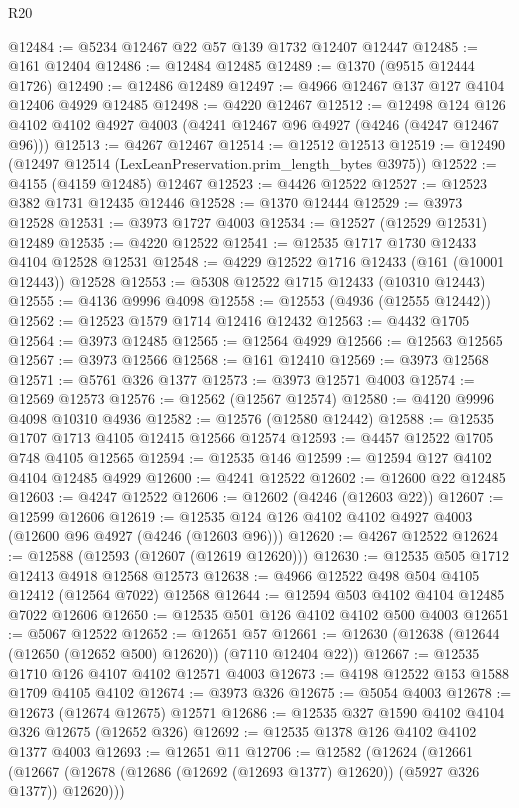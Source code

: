 \begin{lexlean}{R20}
\begin{coremodule}
@12484 := @5234 @12467 @22 @57 @139 @1732 @12407 @12447
@12485 := @161 @12404
@12486 := @12484 @12485
@12489 := @1370 (@9515 @12444 @1726)
@12490 := @12486 @12489
@12497 := @4966 @12467 @137 @127 @4104 @12406 @4929 @12485
@12498 := @4220 @12467
@12512 := @12498
    @124
    @126
    @4102
    @4102
    @4927
    @4003
    (@4241 @12467 @96 @4927 (@4246 (@4247 @12467 @96)))
@12513 := @4267 @12467
@12514 := @12512 @12513
@12519 := @12490 (@12497 @12514 (LexLeanPreservation.prim_length_bytes @3975))
@12522 := @4155 (@4159 @12485) @12467
@12523 := @4426 @12522
@12527 := @12523 @382 @1731 @12435 @12446
@12528 := @1370 @12444
@12529 := @3973 @12528
@12531 := @3973 @1727 @4003
@12534 := @12527 (@12529 @12531) @12489
@12535 := @4220 @12522
@12541 := @12535 @1717 @1730 @12433 @4104 @12528 @12531
@12548 := @4229 @12522 @1716 @12433 (@161 (@10001 @12443)) @12528
@12553 := @5308 @12522 @1715 @12433 (@10310 @12443)
@12555 := @4136 @9996 @4098
@12558 := @12553 (@4936 (@12555 @12442))
@12562 := @12523 @1579 @1714 @12416 @12432
@12563 := @4432 @1705
@12564 := @3973 @12485
@12565 := @12564 @4929
@12566 := @12563 @12565
@12567 := @3973 @12566
@12568 := @161 @12410
@12569 := @3973 @12568
@12571 := @5761 @326 @1377
@12573 := @3973 @12571 @4003
@12574 := @12569 @12573
@12576 := @12562 (@12567 @12574)
@12580 := @4120 @9996 @4098 @10310 @4936
@12582 := @12576 (@12580 @12442)
@12588 := @12535 @1707 @1713 @4105 @12415 @12566 @12574
@12593 := @4457 @12522 @1705 @748 @4105 @12565
@12594 := @12535 @146
@12599 := @12594 @127 @4102 @4104 @12485 @4929
@12600 := @4241 @12522
@12602 := @12600 @22 @12485
@12603 := @4247 @12522
@12606 := @12602 (@4246 (@12603 @22))
@12607 := @12599 @12606
@12619 := @12535 @124 @126 @4102 @4102 @4927 @4003 (@12600 @96 @4927 (@4246 (@12603 @96)))
@12620 := @4267 @12522
@12624 := @12588 (@12593 (@12607 (@12619 @12620)))
@12630 := @12535 @505 @1712 @12413 @4918 @12568 @12573
@12638 := @4966 @12522 @498 @504 @4105 @12412 (@12564 @7022) @12568
@12644 := @12594 @503 @4102 @4104 @12485 @7022 @12606
@12650 := @12535 @501 @126 @4102 @4102 @500 @4003
@12651 := @5067 @12522
@12652 := @12651 @57
@12661 := @12630 (@12638 (@12644 (@12650 (@12652 @500) @12620)) (@7110 @12404 @22))
@12667 := @12535 @1710 @126 @4107 @4102 @12571 @4003
@12673 := @4198 @12522 @153 @1588 @1709 @4105 @4102
@12674 := @3973 @326
@12675 := @5054 @4003
@12678 := @12673 (@12674 @12675) @12571
@12686 := @12535 @327 @1590 @4102 @4104 @326 @12675 (@12652 @326)
@12692 := @12535 @1378 @126 @4102 @4102 @1377 @4003
@12693 := @12651 @11
@12706 := @12582
    (@12624
      (@12661 (@12667 (@12678 (@12686 (@12692 (@12693 @1377) @12620)) (@5927 @326 @1377)) @12620)))

\end{coremodule}
\end{lexlean}

